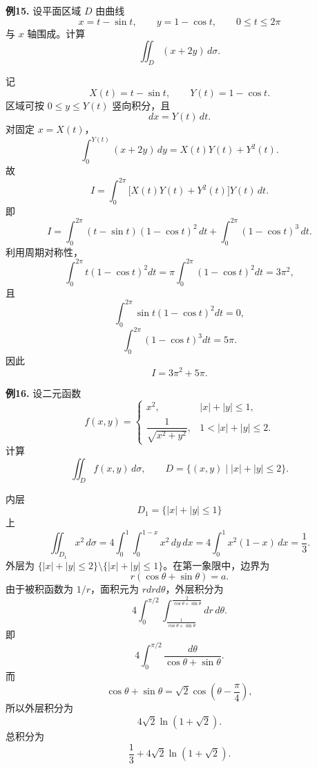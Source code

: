 \begin{problemblock}
\textbf{例15.} 设平面区域 \(D\) 由曲线
\[
x=t-\sin t,\qquad y=1-\cos t,\qquad 0\le t\le2\pi
\]
与 \(x\) 轴围成。计算
\[
\iint_D(x+2y)\,d\sigma.
\]
\end{problemblock}
\begin{solutionblock}
记
\[
X(t)=t-\sin t,\qquad Y(t)=1-\cos t.
\]
区域可按 \(0\le y\le Y(t)\) 竖向积分，且
\[
dx=Y(t)\,dt.
\]
对固定 \(x=X(t)\)，
\[
\int_0^{Y(t)}(x+2y)\,dy
=X(t)Y(t)+Y^2(t).
\]
故
\[
I=\int_0^{2\pi}\bigl[X(t)Y(t)+Y^2(t)\bigr]Y(t)\,dt.
\]
即
\[
I=\int_0^{2\pi}(t-\sin t)(1-\cos t)^2\,dt
+\int_0^{2\pi}(1-\cos t)^3\,dt.
\]
利用周期对称性，
\[
\int_0^{2\pi}t(1-\cos t)^2dt
=\pi\int_0^{2\pi}(1-\cos t)^2dt=3\pi^2,
\]
且
\[
\int_0^{2\pi}\sin t(1-\cos t)^2dt=0,
\]
\[
\int_0^{2\pi}(1-\cos t)^3dt=5\pi.
\]
因此
\[
I=3\pi^2+5\pi.
\]
\end{solutionblock}

\begin{problemblock}
\textbf{例16.} 设二元函数
\[
f(x,y)=
\begin{cases}
x^2,& |x|+|y|\le1,\\[2mm]
\dfrac1{\sqrt{x^2+y^2}},&1<|x|+|y|\le2.
\end{cases}
\]
计算
\[
\iint_D f(x,y)\,d\sigma,\qquad
D=\{(x,y)\mid |x|+|y|\le2\}.
\]
\end{problemblock}
\begin{solutionblock}
内层
\[
D_1=\{|x|+|y|\le1\}
\]
上
\[
\iint_{D_1}x^2\,d\sigma
=4\int_0^1\int_0^{1-x}x^2\,dy\,dx
=4\int_0^1x^2(1-x)\,dx=\frac13.
\]
外层为 \(\{|x|+|y|\le2\}\setminus\{|x|+|y|\le1\}\)。在第一象限中，边界为
\[
r(\cos\theta+\sin\theta)=a.
\]
由于被积函数为 \(1/r\)，面积元为 \(rdrd\theta\)，外层积分为
\[
4\int_0^{\pi/2}\int_{\frac1{\cos\theta+\sin\theta}}^{\frac2{\cos\theta+\sin\theta}}dr\,d\theta.
\]
即
\[
4\int_0^{\pi/2}\frac{d\theta}{\cos\theta+\sin\theta}.
\]
而
\[
\cos\theta+\sin\theta=\sqrt2\cos\left(\theta-\frac\pi4\right),
\]
所以外层积分为
\[
4\sqrt2\ln(1+\sqrt2).
\]
总积分为
\[
\frac13+4\sqrt2\ln(1+\sqrt2).
\]
\end{solutionblock}

